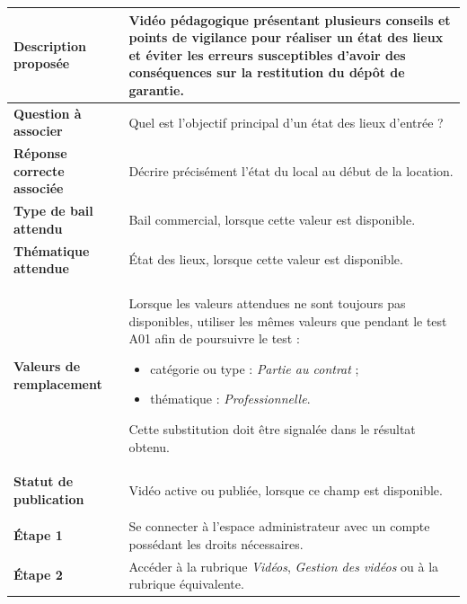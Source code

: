 \begin{longtable}{
    |>{\raggedright\arraybackslash}p{}
    |>{\raggedright\arraybackslash}p{}|
}
\textbf{Description proposée}
&
Vidéo pédagogique présentant plusieurs conseils et points de vigilance pour
réaliser un état des lieux et éviter les erreurs susceptibles d'avoir des
conséquences sur la restitution du dépôt de garantie.
\\
\hline

\textbf{Question à associer}
&
Quel est l'objectif principal d'un état des lieux d'entrée ?
\\
\hline

\textbf{Réponse correcte associée}
&
Décrire précisément l'état du local au début de la location.
\\
\hline

\textbf{Type de bail attendu}
&
Bail commercial, lorsque cette valeur est disponible.
\\
\hline

\textbf{Thématique attendue}
&
État des lieux, lorsque cette valeur est disponible.
\\
\hline

\textbf{Valeurs de remplacement}
&
Lorsque les valeurs attendues ne sont toujours pas disponibles, utiliser
les mêmes valeurs que pendant le test A01 afin de poursuivre le test :

\begin{itemize}[leftmargin=*,nosep]
    \item catégorie ou type : \textit{Partie au contrat} ;
    \item thématique : \textit{Professionnelle}.
\end{itemize}

Cette substitution doit être signalée dans le résultat obtenu.
\\
\hline

\textbf{Statut de publication}
&
Vidéo active ou publiée, lorsque ce champ est disponible.
\\
\hline


\rowcolor{orange!50}
\multicolumn{2}{|c|}{
    \textbf{Déroulement du test}
}
\\
\hline

\textbf{Étape 1}
&
Se connecter à l'espace administrateur avec un compte possédant les droits
nécessaires.
\\
\hline

\textbf{Étape 2}
&
Accéder à la rubrique \textit{Vidéos}, \textit{Gestion des vidéos} ou à la
rubrique équivalente.
\\
\hline


\end{longtable}
